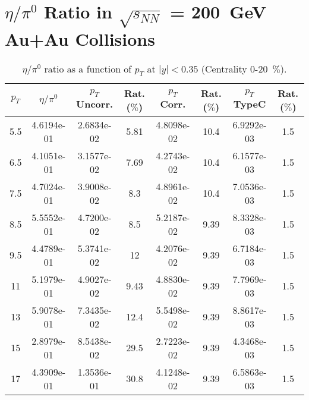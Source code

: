 \chapter{$\eta/\pi^{0}$ Ratio in $\sqrt{s_{NN}}$ = 200~GeV Au+Au Collisions}
\begin{table}[!htb]
\centering
\begin{tabular}{|c|c|c|c|c|c|c|c|}
\hline
$p_{T}$ & $\eta/\pi^{0}$ & $p_{T}$ Uncorr. & Rat. ($\%$)  
& $p_{T}$ Corr. & Rat. ($\%$) & $p_{T}$ TypeC & Rat. ($\%$) \\
\hline
5.5 & 4.6194e-01 & 2.6834e-02 & 5.81 & 4.8098e-02 & 10.4 & 6.9292e-03 & 1.5 \\ 
6.5 & 4.1051e-01 & 3.1577e-02 & 7.69 & 4.2743e-02 & 10.4 & 6.1577e-03 & 1.5 \\ 
7.5 & 4.7024e-01 & 3.9008e-02 & 8.3 & 4.8961e-02 & 10.4 & 7.0536e-03 & 1.5 \\ 
8.5 & 5.5552e-01 & 4.7200e-02 & 8.5 & 5.2187e-02 & 9.39 & 8.3328e-03 & 1.5 \\ 
9.5 & 4.4789e-01 & 5.3741e-02 & 12 & 4.2076e-02 & 9.39 & 6.7184e-03 & 1.5 \\ 
11 & 5.1979e-01 & 4.9027e-02 & 9.43 & 4.8830e-02 & 9.39 & 7.7969e-03 & 1.5 \\ 
13 & 5.9078e-01 & 7.3435e-02 & 12.4 & 5.5498e-02 & 9.39 & 8.8617e-03 & 1.5 \\ 
15 & 2.8979e-01 & 8.5438e-02 & 29.5 & 2.7223e-02 & 9.39 & 4.3468e-03 & 1.5 \\ 
17 & 4.3909e-01 & 1.3536e-01 & 30.8 & 4.1248e-02 & 9.39 & 6.5863e-03 & 1.5 \\ 
\hline
\end{tabular}
\caption{$\eta/\pi^{0}$ ratio as a function of $p_{T}$ at $|y|<0.35$ (Centrality 0-20~$\%$).}
\end{table}
            
